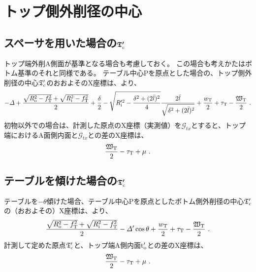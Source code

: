 \clearpage
\section{トップ側外削径の中心}


\subsection[スペーサを用いた場合の$\mathfrak T_\text c'$]
           {スペーサを用いた場合の$\boldsymbol{\mathfrak T_\text c'}$}
トップ端外削A側面が基準となる場合も考慮しておく。
この場合も考えかたはボトム基準のそれと同様である。
テーブル中心Pを原点とした場合の、トップ側外削径の中心$\mathfrak T_\text c'$のおおよそのX座標は、より、
\begin{align*}
  -\varDelta+\frac{\sqrt{R_\text o^2-f_\text T^2}+\sqrt{R_\text i^2-f_\text T^2}}2+\frac\delta2
  -\sqrt{R_\text i'^2-\frac{\delta^2+(2\bar l)^2}4}\frac{2\bar l}{\sqrt{\delta^2+(2\bar l)^2}}
  +\frac{w_\text T}2+\tau_\text T-\frac{\mathfrak W_\text T}2\ .
\end{align*}
初物以外での場合は、計測した原点のX座標（実測値）を$\mathcal G_{tx}$とすると、トップ端におけるA面側内面と$\mathcal G_{tx}$との差のX座標は、
\begin{align*}
  \frac{\mathfrak W_\text T}2-\tau_\text T+\mu~.
\end{align*}


\subsection[テーブルを傾けた場合の$\mathfrak T_\text c'$]
           {テーブルを傾けた場合の$\boldsymbol{\mathfrak T_\text c'}$}
テーブルを$-\theta$傾けた場合、テーブル中心Pを原点としたボトム側外削径の中心$\mathfrak T_\text c'$の（おおよその）X座標は、より、
\begin{align*}
  \frac{\sqrt{R_\text o^2-f_\text T^2}+\sqrt{R_\text i^2-f_\text T^2}}2-\varDelta'\cos\theta
  +\frac{w_\text T}2+\tau_\text T-\frac{\mathfrak W_\text T}2\ .
\end{align*}
計測して定めた原点$\mathfrak T_\text c'$と、トップ端A側内面t$_\text o'$との差のX座標は、
\begin{align*}
  \frac{\mathfrak W_\text T}2-\tau_\text T+\mu~.
\end{align*}




